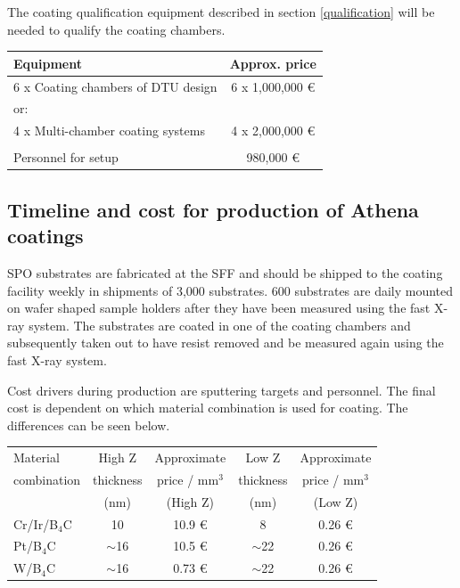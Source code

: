 The coating qualification equipment described in section \ref{qualification} will be needed to qualify the coating chambers.


\begin{table}[htbp]
	\centering
\begin{tabular}{l|c}
Equipment & Approx. price \\
\hline
\hline
6 x Coating chambers of DTU design  & 6 x 1,000,000 \euro\\
\hline
or:\\
\hline
4 x Multi-chamber coating systems & 4 x 2,000,000 \euro \\
\hline
\\
\hline
Personnel for setup & 980,000 \euro\\
\end{tabular}
\end{table}


\subsection{Timeline and cost for production of Athena coatings}
SPO substrates are fabricated at the SFF and should be shipped to the coating facility weekly in shipments of 3,000 substrates. 600 substrates are daily mounted on wafer shaped sample holders after they have been measured using the fast X-ray system. The substrates are coated in one of the coating chambers and subsequently taken out to have resist removed and be measured again using the fast X-ray system.

Cost drivers during production are sputtering targets and personnel. The final cost is dependent on which material combination is used for coating. The differences can be seen below.

\begin{table}[htbp]
	\centering
\begin{tabular}{l|c|c|c|c}
Material 	& High Z 		& Approximate & Low Z  & Approximate \\
combination & thickness & price / mm$^3$ & thickness &  price / mm$^3$ \\
 & (nm) & (High Z) & (nm) &  (Low Z) \\
\hline
\hline
Cr/Ir/B$_4$C & 10 & 10.9 \euro & 8 & 0.26 \euro\\
\hline
Pt/B$_4$C & $\sim$16 & 10.5 \euro & $\sim$22 & 0.26 \euro\\
\hline
W/B$_4$C & $\sim$16 & 0.73 \euro & $\sim$22 & 0.26 \euro\\
\end{tabular}
\end{table}

